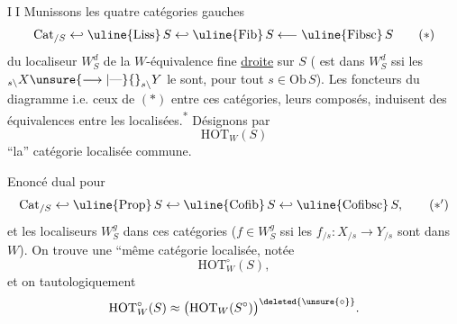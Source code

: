 \textcircled{II} Munissons les quatre catégories  gauches
\[
 \mathrm{Cat}_{/S}\hookleftarrow\text{\uline{Liss}}\,S\hookleftarrow\text{\uline{Fib}}\,S\longleftarrow\text{\uline{Fibsc}}\,S
 \tag*{$(*)$}
\]
du localiseur $W_S^d$ de la $W$-équivalence fine \uline{droite} sur $S$ (
est dans $W_S^d$ ssi les ${}_{s\backslash}X\unsure{\longrightarrow|\text{---}}{}_{s\backslash}Y$ le sont, pour tout $s\in\mathrm{Ob}\,S$). Les foncteurs du diagramme i.e. ceux de $(*)$ entre ces catégories,   leurs composés, induisent des équivalences entre les localisées.\textsuperscript{*}
Désignons par
\[
 \mathrm{HOT}_W(S)
\]
``la'' catégorie localisée commune.

Enoncé dual pour
\[
 \mathrm{Cat}_{/S}\hookleftarrow\text{\uline{Prop}}\,S\hookleftarrow\text{\uline{Cofib}}\,S\hookleftarrow\text{\uline{Cofibsc}}\,S,
 \tag*{$(*')$}
\]
et les localiseurs $W_S^g$ dans ces catégories ($f\in W_S^g$ ssi les $f_{/s}:X_{/s}\longrightarrow Y_{/s}$ sont dans $W$). On trouve une ``même catégorie localisée, notée
\[
 \mathrm{HOT}_W^\circ(S),
\]
et on   tautologiquement
\[
 \mathrm{HOT}_W^\circ(S)\approx\bigl(\mathrm{HOT}_W(S^\circ)\bigr)^{\deleted{\unsure{\circ}}}.
\]

